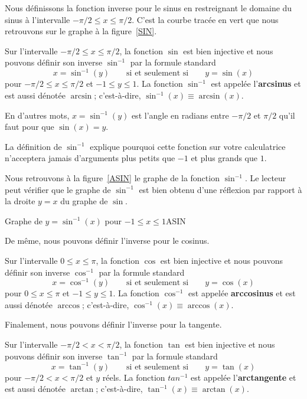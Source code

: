 {Nous définissons la fonction inverse pour le sinus en restreignant le
domaine du sinus à l'intervalle $-\pi/2 \leq x \leq \pi/2$.  C'est la
courbe tracée en vert que nous retrouvons sur le graphe
à la figure~\ref{SIN}.

\begin{focus}{\dfn} 
Sur l'intervalle $-\pi/2 \leq x \leq \pi/2$, la fonction $\sin$ est
bien injective et nous pouvons définir son inverse $\sin^{-1}$ par la
formule standard
\[
x = \sin^{-1}(y) \qquad \text{si et seulement si} \qquad y = \sin(x)
\]
pour $-\pi/2 \leq x \leq \pi/2$ et $-1 \leq y \leq 1$.  La fonction
$\sin^{-1}$ est appelée l'{\bfseries arcsinus} et est
aussi dénotée $\arcsin$; c'est-à-dire, $\sin^{-1}(x) \equiv \arcsin(x)$.
\end{focus}

En d'autres mots, $x = \sin^{-1}(y)$ est l'angle en radians entre
$-\pi/2$ et $\pi/2$ qu'il faut pour que $\sin(x) = y$.

La définition de $\sin^{-1}$ explique pourquoi cette fonction sur
votre calculatrice n'acceptera jamais d'arguments plus petits que $-1$
et plus grands que $1$.

Nous retrouvons à la figure~\ref{ASIN} le graphe de la fonction
$\sin^{-1}$.  Le lecteur peut vérifier que le graphe de $\sin^{-1}$
est bien obtenu d'une réflexion par rapport à la droite $y=x$ du
graphe de $\sin$.

{Graphe de $y=\sin^{-1}(x)$ pour $-1 \leq x \leq 1$}{ASIN}

De même, nous pouvons définir l'inverse pour le cosinus.

\begin{focus}{\dfn} 
Sur l'intervalle $0 \leq x \leq \pi$, la fonction $\cos$ est bien
injective et nous pouvons définir son inverse $\cos^{-1}$ par la formule
standard
\[
x = \cos^{-1}(y) \qquad \text{si et seulement si} \qquad y = \cos(x)
\]
pour $0 \leq x \leq \pi$ et $-1 \leq y \leq 1$.  La fonction
$\cos^{-1}$ est appelée {\bfseries arccosinus} et
est aussi dénotée $\arccos$; c'est-à-dire,
$\cos^{-1}(x) \equiv \arccos(x)$.
\end{focus}

Finalement, nous pouvons définir l'inverse pour la tangente.

\begin{focus}{\dfn} 
Sur l'intervalle $-\pi/2 < x < \pi/2$,  la fonction $\tan$ est bien
injective et nous pouvons définir son inverse $\tan^{-1}$ par la formule
standard
\[
x = \tan^{-1}(y) \qquad \text{si et seulement si} \qquad y = \tan(x)
\]
pour $-\pi/2 < x < \pi/2$ et $y$ réels.  La fonction $tan^{-1}$ est
appelée l'{\bfseries arctangente} et est aussi
dénotée $\arctan$; c'est-à-dire, $\tan^{-1}(x) \equiv \arctan(x)$.
\end{focus}

}
